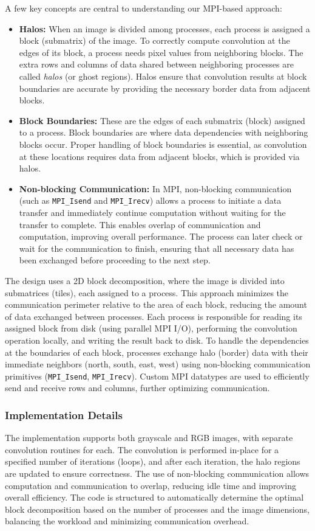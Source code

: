 \documentclass[conference, 10pt]{IEEEtran}
\begin{document}
A few key concepts are central to understanding our MPI-based approach:
\begin{itemize}
    \item \textbf{Halos:} When an image is divided among processes, each process is assigned a block (submatrix) of the image. To correctly compute convolution at the edges of its block, a process needs pixel values from neighboring blocks. The extra rows and columns of data shared between neighboring processes are called \textit{halos} (or ghost regions). Halos ensure that convolution results at block boundaries are accurate by providing the necessary border data from adjacent blocks.
    \item \textbf{Block Boundaries:} These are the edges of each submatrix (block) assigned to a process. Block boundaries are where data dependencies with neighboring blocks occur. Proper handling of block boundaries is essential, as convolution at these locations requires data from adjacent blocks, which is provided via halos.
    \item \textbf{Non-blocking Communication:} In MPI, non-blocking communication (such as \texttt{MPI\_Isend} and \texttt{MPI\_Irecv}) allows a process to initiate a data transfer and immediately continue computation without waiting for the transfer to complete. This enables overlap of communication and computation, improving overall performance. The process can later check or wait for the communication to finish, ensuring that all necessary data has been exchanged before proceeding to the next step.
\end{itemize}

The design uses a 2D block decomposition, where the image is divided into submatrices (tiles), each assigned to a process. This approach minimizes the communication perimeter relative to the area of each block, reducing the amount of data exchanged between processes. Each process is responsible for reading its assigned block from disk (using parallel MPI I/O), performing the convolution operation locally, and writing the result back to disk. To handle the dependencies at the boundaries of each block, processes exchange halo (border) data with their immediate neighbors (north, south, east, west) using non-blocking communication primitives (\texttt{MPI\_Isend}, \texttt{MPI\_Irecv}). Custom MPI datatypes are used to efficiently send and receive rows and columns, further optimizing communication.

\subsubsection{Implementation Details}
The implementation supports both grayscale and RGB images, with separate convolution routines for each. The convolution is performed in-place for a specified number of iterations (loops), and after each iteration, the halo regions are updated to ensure correctness. The use of non-blocking communication allows computation and communication to overlap, reducing idle time and improving overall efficiency. The code is structured to automatically determine the optimal block decomposition based on the number of processes and the image dimensions, balancing the workload and minimizing communication overhead.
\end{document}
